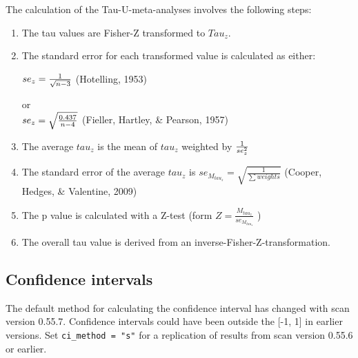 \documentclass[
  letterpaper,
  DIV=11,
  numbers=noendperiod]{scrreprt}
\begin{document}
\begin{tcolorbox}[enhanced jigsaw, breakable, toptitle=1mm, colframe=quarto-callout-note-color-frame, arc=.35mm, titlerule=0mm, coltitle=black, rightrule=.15mm, bottomtitle=1mm, bottomrule=.15mm, colbacktitle=quarto-callout-note-color!10!white, title=\textcolor{quarto-callout-note-color}{\faInfo}\hspace{0.5em}{Calculating a Tau-U meta analysis}, colback=white, opacitybacktitle=0.6, opacityback=0, leftrule=.75mm, toprule=.15mm, left=2mm]

The calculation of the Tau-U-meta-analyses involves the following steps:

\begin{enumerate}
\def\labelenumi{\arabic{enumi}.}
\item
  The tau values are Fisher-Z transformed to \(Tau_z\).
\item
  The standard error for each transformed value is calculated as either:

  \(se_z = {1 \over \sqrt{n-3}}\) (Hotelling, 1953)

  or\\
  \(se_z = \sqrt{0.437 \over n-4}\) (Fieller, Hartley, \& Pearson, 1957)
\item
  The average \(tau_z\) is the mean of \(tau_z\) weighted by
  \(1 \over se_z^2\)
\item
  The standard error of the average \(tau_z\) is
  \(se_{M_{tau_z}} = \sqrt{\frac{1}{\sum{weights}}}\) (Cooper, Hedges,
  \& Valentine, 2009)
\item
  The p value is calculated with a Z-test (form
  \(Z = \frac{M_{tau_z}}{se_{M_{tau_z}}}\) )
\item
  The overall tau value is derived from an
  inverse-Fisher-Z-transformation.
\end{enumerate}

\end{tcolorbox}

\hypertarget{confidence-intervals}{%
\subsection{Confidence intervals}\label{confidence-intervals}}

\begin{tcolorbox}[enhanced jigsaw, breakable, toptitle=1mm, colframe=quarto-callout-note-color-frame, arc=.35mm, titlerule=0mm, coltitle=black, rightrule=.15mm, bottomtitle=1mm, bottomrule=.15mm, colbacktitle=quarto-callout-note-color!10!white, title=\textcolor{quarto-callout-note-color}{\faInfo}\hspace{0.5em}{Note}, colback=white, opacitybacktitle=0.6, opacityback=0, leftrule=.75mm, toprule=.15mm, left=2mm]

The default method for calculating the confidence interval has changed
with scan version 0.55.7. Confidence intervals could have been outside
the {[}-1, 1{]} in earlier versions. Set \texttt{ci\_method\ =\ "s"} for
a replication of results from scan version 0.55.6 or earlier.

\end{tcolorbox}
\end{document}
